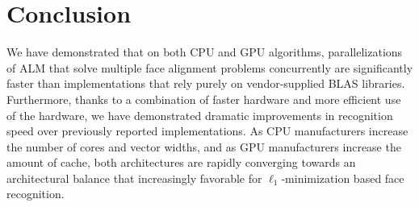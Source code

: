 \section{Conclusion}
We have demonstrated that on both CPU and GPU algorithms, parallelizations of
ALM that solve multiple face alignment problems concurrently are significantly
faster than implementations that rely purely on vendor-supplied BLAS libraries.
Furthermore, thanks to a combination of faster hardware and more efficient use
of the hardware, we have demonstrated dramatic improvements in recognition
speed over previously reported implementations.
As CPU manufacturers increase the number of cores and vector widths, and as GPU 
manufacturers increase the amount
of cache, both architectures are rapidly converging towards an architectural balance
that increasingly favorable for $\ell_1$-minimization based face recognition.



